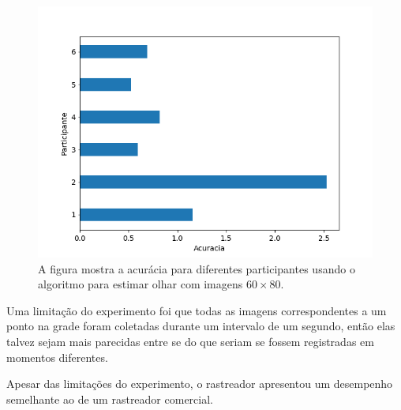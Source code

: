 \begin{figure}
    \centering
    \includegraphics[scale=.6]{imagens/errosParticipantes_pyrDown3.png}
    \caption{A figura mostra a acurácia para diferentes participantes usando o algoritmo para estimar olhar com imagens $60 \times 80$. }
    \label{fig:erros_participante}
\end{figure}

Uma limitação do experimento foi que todas as imagens correspondentes a um ponto na grade foram coletadas durante um intervalo de um segundo, então elas talvez sejam mais parecidas entre se do que seriam se fossem registradas em momentos diferentes.

Apesar das limitações do experimento, o rastreador apresentou um desempenho semelhante ao de um rastreador comercial.